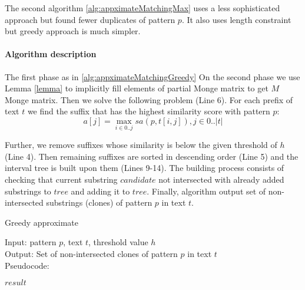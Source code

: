 The second algorithm \ref{alg:appximateMatchingMax} uses a less sophisticated approach but found fewer duplicates of pattern $p$.
It also uses length constraint but greedy approach
is much simpler.

\paragraph{Algorithm description}

The first phase as in \ref{alg:appximateMatchingGreedy}
On the second phase we use Lemma \ref{lemma} to implicitly fill 
elements of partial Monge matrix to get $M$ Monge matrix.
Then we solve the following problem (Line 6).
For each prefix of text $t$ we find the suffix that has the highest similarity score with pattern $p$:
$$ a[j] = \max _{i \in 0 ..j} sa(p,t[i,j]), j \in 0..|t|$$

Further, we remove suffixes whose similarity is below the given threshold of $h$ (Line 4).
Then remaining suffixes are sorted in descending order (Line 5) and the interval tree is built upon them (Lines 9-14).
The building process consists of checking that current substring $candidate$ not intersected with already added substrings to $tree$ and adding it to $tree$.
Finally, algorithm output set of non-intersected substrings (clones) of pattern $p$ in text $t$.


\begin{algorithm}[H]
\caption{Greedy approximate}
\label{alg:appximateMatchingMax}
Input: pattern $p$, text $t$, threshold value $h$\\
Output: Set of non-intersected clones of pattern $p$ in text $t$\\
Pseudocode:
\begin{algorithmic}[1]

\ENDIF
\ENDFOR
{}
\RETURN $result$
\end{algorithmic}
\end{algorithm}

